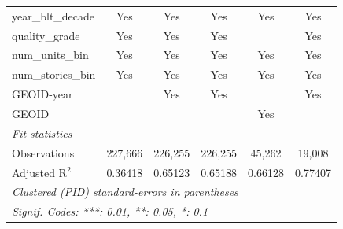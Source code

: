 \begin{tabular}{lccccc}
   year\_blt\_decade                & Yes            & Yes            & Yes            & Yes           & Yes\\  
   quality\_grade                   & Yes            & Yes            & Yes            &               & Yes\\  
   num\_units\_bin                  & Yes            & Yes            & Yes            & Yes           & Yes\\  
   num\_stories\_bin                & Yes            & Yes            & Yes            & Yes           & Yes\\  
   GEOID-year                       &                & Yes            & Yes            &               & Yes\\  
   GEOID                            &                &                &                & Yes           & \\  
   \midrule
   \emph{Fit statistics}\\
   Observations                     & 227,666        & 226,255        & 226,255        & 45,262        & 19,008\\  
   Adjusted R$^2$                   & 0.36418        & 0.65123        & 0.65188        & 0.66128       & 0.77407\\  
   \midrule \midrule
   \multicolumn{6}{l}{\emph{Clustered (PID) standard-errors in parentheses}}\\
   \multicolumn{6}{l}{\emph{Signif. Codes: ***: 0.01, **: 0.05, *: 0.1}}\\
\end{tabular}
\par\endgroup
